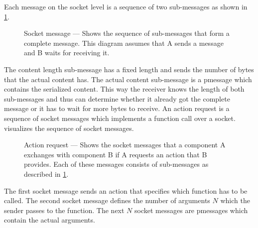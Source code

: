 Each message on the socket level is a sequence of two sub-messages as shown in \cref{fig:socketMessage}.
\begin{figure}
    \centering
    
    \medskip
    \caption{%
        Socket message --- Shows the sequence of sub-messages that form a complete message.
        This diagram assumes that A sends a message and B waits for receiving it.
    }\label{fig:socketMessage}
\end{figure}
The content length sub-message has a fixed length and sends the number of bytes that the actual content has.
The actual content sub-message is a \gls{pmessage} which contains the serialized content.
This way the receiver knows the length of both sub-messages and thus can determine whether it already got the complete message or it has to wait for more bytes to receive.
An action request is a sequence of socket messages which implements a function call over a socket.
 visualizes the sequence of socket messages.
\begin{figure}
    \centering
    
    \medskip
    \caption{%
        Action request --- Shows the socket messages that a component A exchanges with component B if A requests an action that B provides.
        Each of these messages consists of sub-messages as described in \cref{fig:socketMessage}.
    }\label{fig:actionRequest}
\end{figure}
The first socket message sends an action that specifies which function has to be called.
The second socket message defines the number of arguments \(N\) which the sender passes to the function.
The next \(N\) socket messages are \glspl{pmessage} which contain the actual arguments.

